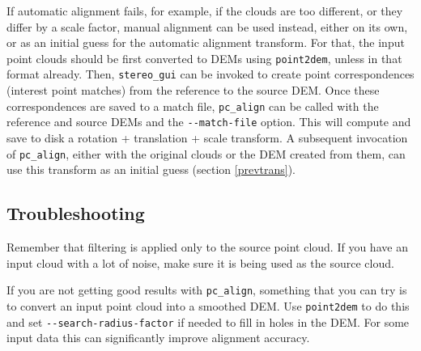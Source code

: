 If automatic alignment fails, for example, if the clouds are too
different, or they differ by a scale factor, manual alignment can be
used instead, either on its own, or as an initial guess for the
automatic alignment transform. For that, the input point clouds should
be first converted to DEMs using \texttt{point2dem}, unless in that
format already. Then, \texttt{stereo\_gui} can be invoked to create
point correspondences (interest point matches) from the reference to the
source DEM. Once these correspondences are saved to a match file,
\texttt{pc\_align} can be called with the reference and source DEMs and
the \texttt{-\/-match-file} option.  This will compute and save to disk
a rotation + translation + scale transform.  A subsequent invocation of
\texttt{pc\_align}, either with the original clouds or the DEM created
from them, can use this transform as an initial guess (section
\ref{prevtrans}).

\subsection{Troubleshooting}

Remember that filtering is applied only to the source point cloud.
If you have an input cloud with a lot of noise, make sure it is
being used as the source cloud.

If you are not getting good results with \texttt{pc\_align}, something
that you can try is to convert an input point cloud into a smoothed DEM.
Use \texttt{point2dem} to do this and set \texttt{-\/-search-radius-factor}
if needed to fill in holes in the DEM.  For some input data this can
significantly improve alignment accuracy.

\medskip

